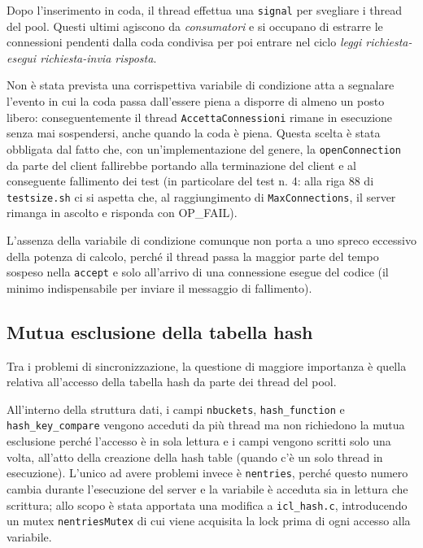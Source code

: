 \documentclass[a4paper,12pt]{article}
\begin{document}
Dopo l'inserimento in coda, il thread effettua una \texttt{signal} per svegliare i thread del pool. Questi ultimi agiscono da \textit{consumatori} e si occupano di estrarre le connessioni pendenti dalla coda condivisa per poi entrare nel ciclo \textit{leggi richiesta-esegui richiesta-invia risposta}.

Non è stata prevista una corrispettiva variabile di condizione atta a segnalare l'evento in cui la coda passa dall'essere piena a disporre di almeno un posto libero: conseguentemente il thread \texttt{AccettaConnessioni} rimane in esecuzione senza mai sospendersi, anche quando la coda è piena. Questa scelta è stata obbligata dal fatto che, con un'implementazione del genere, la \texttt{openConnection} da parte del client fallirebbe portando alla terminazione del client e al conseguente fallimento dei test (in particolare del test n. 4: alla riga 88 di \texttt{testsize.sh} ci si aspetta che, al raggiungimento di \texttt{MaxConnections}, il server rimanga in ascolto e risponda con OP\_FAIL).

L'assenza della variabile di condizione comunque non porta a uno spreco eccessivo della potenza di calcolo, perché il thread passa la maggior parte del tempo sospeso nella \texttt{accept} e solo all'arrivo di una connessione esegue del codice (il minimo indispensabile per inviare il messaggio di fallimento).

\subsection{ Mutua esclusione della tabella hash }

Tra i problemi di sincronizzazione, la questione di maggiore importanza è quella relativa all'accesso della tabella hash da parte dei thread del pool.

All'interno della struttura dati, i campi \texttt{nbuckets}, \texttt{hash\_function} e \texttt{hash\_key\_compare} vengono acceduti da più thread ma non richiedono la mutua esclusione perché l'accesso è in sola lettura e i campi vengono scritti solo una volta, all'atto della creazione della hash table (quando c'è un solo thread in esecuzione). L'unico ad avere problemi invece è \texttt{nentries}, perché questo numero cambia durante l'esecuzione del server e la variabile è acceduta sia in lettura che scrittura; allo scopo è stata apportata una modifica a \texttt{icl\_hash.c}, introducendo un mutex \texttt{nentriesMutex} di cui viene acquisita la lock prima di ogni accesso alla variabile.
\end{document}
